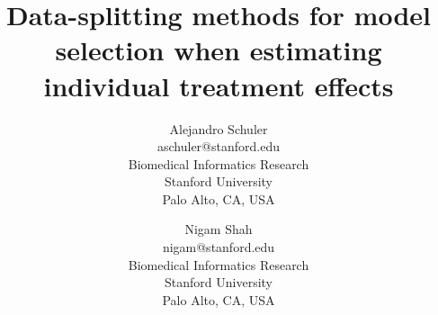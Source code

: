 \documentclass{article}
\begin{document}
\title{Data-splitting methods for model selection when estimating individual treatment effects}

\author{Alejandro Schuler \\
	aschuler@stanford.edu \\
       Biomedical Informatics Research\\
       Stanford University\\
       Palo Alto, CA, USA 
          \and
     Nigam Shah \\
     nigam@stanford.edu \\
       Biomedical Informatics Research\\
       Stanford University\\
       Palo Alto, CA, USA }

\maketitle



 

% 
% 
% 





\end{document}
